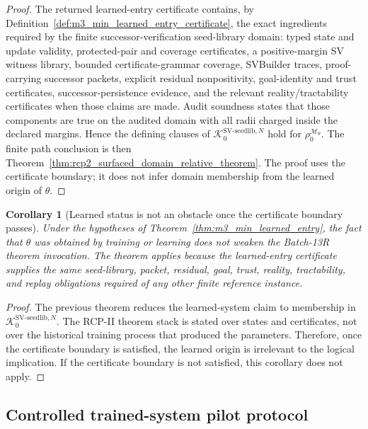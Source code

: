\documentclass[11pt]{article}
\newtheorem{corollary}[theorem]{Corollary}
\newcommand{\1}{\mathbf{1}}
\providecommand{\Kcal}{\mathcal{K}}
\begin{document}
\begin{proof}
The returned learned-entry certificate contains, by Definition~\ref{def:m3_min_learned_entry_certificate}, the exact ingredients required by the finite successor-verification seed-library domain: typed state and update validity, protected-pair and coverage certificates, a positive-margin SV witness library, bounded certificate-grammar coverage, SVBuilder traces, proof-carrying successor packets, explicit residual nonpositivity, goal-identity and trust certificates, successor-persistence evidence, and the relevant reality/tractability certificates when those claims are made.  Audit soundness states that those components are true on the audited domain with all radii charged inside the declared margins.  Hence the defining clauses of \(\Kcal_0^{\mathrm{SV\mbox{-}seedlib},N}\) hold for \(\rho_0^{\mathcal M_\theta}\).  The finite path conclusion is then Theorem~\ref{thm:rcp2_surfaced_domain_relative_theorem}.  The proof uses the certificate boundary; it does not infer domain membership from the learned origin of \(\theta\).
\end{proof}

\begin{corollary}[Learned status is not an obstacle once the certificate boundary passes]
\label{cor:m3_min_learned_status_no_obstacle}
Under the hypotheses of Theorem~\ref{thm:m3_min_learned_entry}, the fact that \(\theta\) was obtained by training or learning does not weaken the Batch-13R theorem invocation.  The theorem applies because the learned-entry certificate supplies the same seed-library, packet, residual, goal, trust, reality, tractability, and replay obligations required of any other finite reference instance.
\end{corollary}

\begin{proof}
The previous theorem reduces the learned-system claim to membership in \(\Kcal_0^{\mathrm{SV\mbox{-}seedlib},N}\).  The RCP-II theorem stack is stated over states and certificates, not over the historical training process that produced the parameters.  Therefore, once the certificate boundary is satisfied, the learned origin is irrelevant to the logical implication.  If the certificate boundary is not satisfied, this corollary does not apply.
\end{proof}

\subsection{Controlled trained-system pilot protocol}
\end{document}
